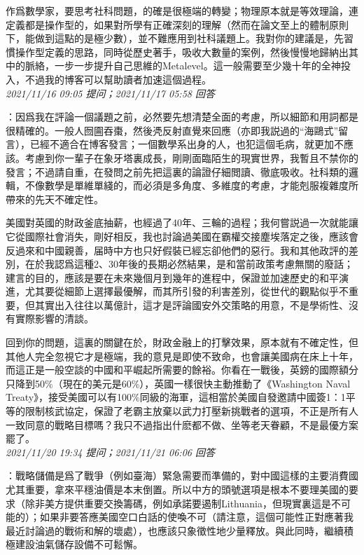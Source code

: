 \documentclass[twocolumn]{ctexart}
\begin{document}
作爲數學家，要思考社科問題，的確是很極端的轉變；物理原本就是等效理論，連定義都是操作型的，如果對所學有正確深刻的理解（然而在論文至上的體制原則下，能做到這點的是極少數），並不難應用到社科議題上。我對你的建議是，先習慣操作型定義的思路，同時從歷史著手，吸收大數量的案例，然後慢慢地歸納出其中的脈絡，一步一步提升自己思維的Metalevel。這一般需要至少幾十年的全神投入，不過我的博客可以幫助讀者加速這個過程。
\\

\textit{\hfill\noindent\small 2021/11/16 09:05 提问；2021/11/17 05:58 回答}

：因爲我在評論一個議題之前，必然要先想清楚全面的考慮，所以細節和用詞都是很精確的。一般人囫圇吞棗，然後凴反射直覺來回應（亦即我説過的“海鷗式”留言），已經不適合在博客發言；一個數學系出身的人，也犯這個毛病，就更加不應該。考慮到你一輩子在象牙塔裏成長，剛剛面臨陌生的現實世界，我暫且不禁你的發言；不過請自重，在發問之前先把這裏的論證仔細閲讀、徹底吸收。社科類的邏輯，不像數學是單維單綫的，而必須是多角度、多維度的考慮，才能剋服複雜度所帶來的先天不確定性。

美國對英國的財政釜底抽薪，也經過了40年、三輪的過程；我何嘗説過一次就能讓它從國際社會消失，剛好相反，我也討論過美國在霸權交接塵埃落定之後，應該會反過來和中國親善，届時中方也只好假裝已經忘卻他們的惡行。我和其他政評的差別，在於我認爲這種2、30年後的長期必然結果，是和當前政策考慮無關的廢話；建言的目的，應該是要在未來幾個月到幾年的進程中，保證並加速歷史的和平演進，尤其要從細節上選擇最優解，而其所引發的利害差別，從世代的觀點似乎不重要，但其實出入往往以萬億計，這才是評論國安外交策略的用意，不是學術性、沒有實際影響的清談。

回到你的問題，這裏的關鍵在於，財政金融上的打擊效果，原本就有不確定性，但其他人完全忽視它才是極端，我的意見是即使不致命，也會讓美國病在床上十年，而這正是一般空談的中國和平崛起所需要的餘裕。你看在一戰後，英鎊的國際額分只降到50\%（現在的美元是60\%），英國一樣很快主動推動了《Washington Naval Treaty》，接受美國可以有100\%同級的海軍，這相當於美國自發邀請中國簽1：1平等的限制核武協定，保證了老霸主放棄以武力打壓新挑戰者的選項，不正是所有人一致同意的戰略目標嗎？我只不過指出什麽都不做、坐等老天眷顧，不是最優方案罷了。
\\

\textit{\hfill\noindent\small 2021/11/20 19:34 提问；2021/11/21 06:06 回答}

：戰略儲備是爲了戰爭（例如臺海）緊急需要而準備的，對中國這樣的主要消費國尤其重要，拿來平穩油價是本末倒置。所以中方的頭號選項是根本不要理美國的要求（除非美方提供重要交換籌碼，例如承諾要遏制Lithuania，但現實裏這是不可能的）；如果非要答應美國空口白話的使喚不可（請注意，這個可能性正對應著我最近討論過的戰術和解的壞處），也應該只象徵性地少量釋放。與此同時，繼續積極建設油氣儲存設備不可鬆懈。
\end{document}
